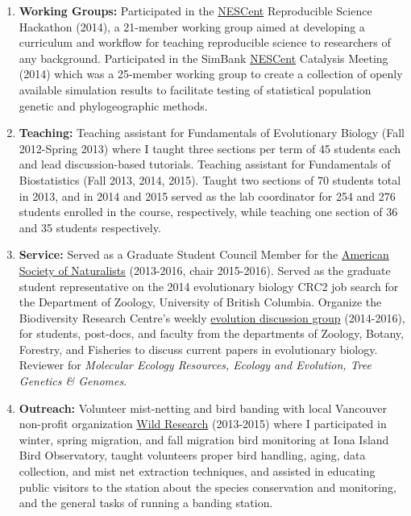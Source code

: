 \begin{enumerate}[itemsep=-0.25ex]
\item \textbf{Working Groups:} Participated in the \href{http://www.nescent.org/}{NESCent} Reproducible Science Hackathon (2014), a 21-member working group aimed at developing a curriculum and workflow for teaching reproducible science to researchers of any background. Participated in the SimBank \href{http://www.nescent.org/}{NESCent} Catalysis Meeting (2014) which was a 25-member working group to create a collection of openly available simulation results to facilitate testing of statistical population genetic and phylogeographic methods.

\item \textbf{Teaching:} Teaching assistant for Fundamentals of Evolutionary Biology (Fall 2012-Spring 2013) where I taught three sections per term of 45 students each and lead discussion-based tutorials. Teaching assistant for Fundamentals of Biostatistics (Fall 2013, 2014, 2015). Taught two sections of 70 students total in 2013, and in 2014 and 2015 served as the lab coordinator for 254 and 276 students enrolled in the course, respectively, while teaching one section of 36 and 35 students respectively.

\item \textbf{Service:} Served as a Graduate Student Council Member for the \href {http://www.amnat.org/home.html}{American Society of Naturalists} (2013-2016, chair 2015-2016). Served as the graduate student representative on the 2014 evolutionary biology CRC2 job search for the Department of Zoology, University of British Columbia. Organize the Biodiversity Research Centre's weekly \href{http://www.biodiversity.ubc.ca/edg/}{evolution discussion group} (2014-2016), for students, post-docs, and faculty  from the departments of Zoology, Botany, Forestry, and Fisheries to discuss current papers in evolutionary biology. Reviewer for \emph{Molecular Ecology Resources, Ecology and Evolution, Tree Genetics \& Genomes}.

\item \textbf{Outreach:}  Volunteer mist-netting and bird banding with local Vancouver non-profit organization \href {http://www.wildresearch.ca/IonaIsland.html}{Wild Research} (2013-2015) where I participated in winter, spring migration, and fall migration bird monitoring at Iona Island Bird Observatory, taught volunteers proper bird handling, aging, data collection, and mist net extraction techniques, and assisted in educating public visitors to the station about the species conservation and monitoring, and the general tasks of running a banding station.

\end{enumerate}


